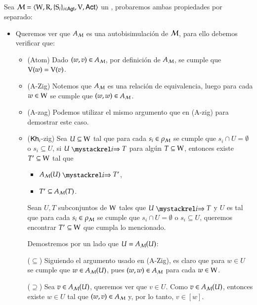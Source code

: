 \begin{demostracion}
    Sea $\mathcal{M}=\langle \mathrm{W},\mathrm{R},\{ \mathrm{S}_i \}_{i \in {\rm \sf Agt}},\mathrm{V},{\rm \sf Act} \rangle$ un \ults, probaremos ambas propiedades por separado:

    \begin{itemize}
        \item Queremos ver que $A_{\mathcal{M}}$ es una autobisimulación de $\mathcal{M}$, para ello debemos verificar que:
        \begin{itemize}
            \item (Atom) Dado $(w,v) \in A_{\mathcal{M}}$, por definición de $A_{\mathcal{M}}$, se cumple que $\mathrm{V}(w) = \mathrm{V}(v)$.
            \item (A-Zig) Notemos que $A_{\mathcal{M}}$ es una relación de equivalencia, luego para cada $w\in \mathrm{W}$ se cumple que $(w,w) \in A_{\mathcal{M}}$.
            \item (A-zag) Podemos utilizar el mismo argumento que en (A-zig) para demostrar este caso.
            \item ($\mathsf{Kh}_i$-zig) Sea $U \subseteq \mathrm{W}$ tal que para cada $s_i \in \rho_{\mathcal{M}}$ se cumple que $s_i \cap U = \emptyset$ o 
            $s_i \subseteq U$, si $U \ultsExecAgi T$ para algún $T \subseteq \mathrm{W}$, entonces existe $T' \subseteq \mathrm{W}$ tal que
                \begin{multicols}{2}
                    \begin{itemize}
                        \item $A_\modults(U) \ultsExecAgi T'$, 
                        \item $T' \subseteq A_{\mathcal{M}}(T)$.
                    \end{itemize}
                \end{multicols}

            Sean $U,T$ subconjuntos de $\mathrm{W}$ tales que $U \ultsExecAgi T$ y $U$ es tal que para cada $s_i \in \rho_{\mathcal{M}}$ se cumple que 
            $s_i \cap U = \emptyset$ o $s_i \subseteq U$, queremos encontrar $T' \subseteq \mathrm{W}$ que cumpla lo mencionado.
            
            Demostremos por un lado que $U = A_{\mathcal{M}}(U)$:
            
            ($\subseteq$) Siguiendo el argumento usado en (A-Zig), es claro que para $w \in U$ se cumple que $w \in A_{\mathcal{M}}(U)$, 
            pues $(w,w) \in A_{\mathcal{M}}$ para cada $w \in \mathrm{W}$. 
            
            ($\supseteq$) Sea $v \in A_{\mathcal{M}}(U)$, queremos ver que $v \in U$.
            Como $v \in A_{\mathcal{M}}(U)$, entonces existe $w \in U$ tal que $(w,v) \in A_{\mathcal{M}}$ y, por lo tanto, $v \in [w]$.
            

\end{itemize}
\end{itemize}
\end{demostracion}
